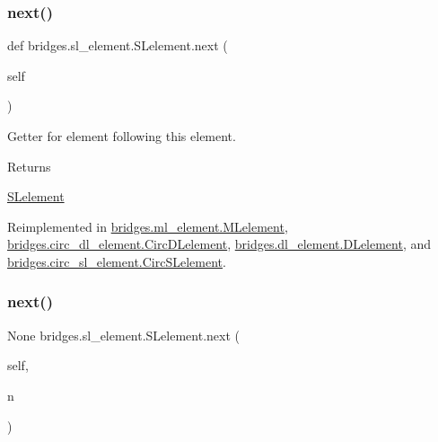\mbox{\label{classbridges_1_1sl__element_1_1_s_lelement_acef793fc5e2533fb91795d01904e8b6d}} 
\subsubsection{\texorpdfstring{next()}{next()}\hspace{0.1cm}{\footnotesize\ttfamily [1/2]}}
{\footnotesize\ttfamily def bridges.\+sl\+\_\+element.\+S\+Lelement.\+next (\begin{DoxyParamCaption}\item[{}]{self }\end{DoxyParamCaption})}



Getter for element following this element. 

\begin{DoxyReturn}{Returns}


\mbox{\hyperlink{classbridges_1_1sl__element_1_1_s_lelement}{S\+Lelement}} 
\end{DoxyReturn}


Reimplemented in \mbox{\hyperlink{classbridges_1_1ml__element_1_1_m_lelement_a951d30261514e6eaefdd7d60f1c77f73}{bridges.\+ml\+\_\+element.\+M\+Lelement}}, \mbox{\hyperlink{classbridges_1_1circ__dl__element_1_1_circ_d_lelement_a09b8b12344743709cce1d5fd926b88e9}{bridges.\+circ\+\_\+dl\+\_\+element.\+Circ\+D\+Lelement}}, \mbox{\hyperlink{classbridges_1_1dl__element_1_1_d_lelement_a43077e810ec453c9cd512ba75819e28a}{bridges.\+dl\+\_\+element.\+D\+Lelement}}, and \mbox{\hyperlink{classbridges_1_1circ__sl__element_1_1_circ_s_lelement_a5abc123aa4a20414a02785f3b1cc342a}{bridges.\+circ\+\_\+sl\+\_\+element.\+Circ\+S\+Lelement}}.

\mbox{\label{classbridges_1_1sl__element_1_1_s_lelement_a210373939597f4c3bcc26fff98b4e44f}} 
\subsubsection{\texorpdfstring{next()}{next()}\hspace{0.1cm}{\footnotesize\ttfamily [2/2]}}
{\footnotesize\ttfamily  None bridges.\+sl\+\_\+element.\+S\+Lelement.\+next (\begin{DoxyParamCaption}\item[{}]{self,  }\item[{}]{n }\end{DoxyParamCaption})}



